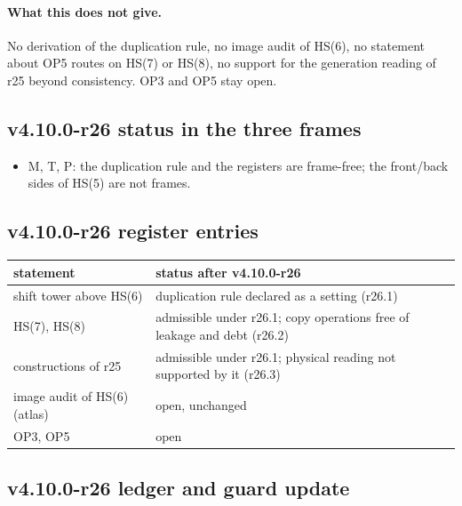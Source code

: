 \paragraph{What this does not give.}
No derivation of the duplication rule, no image audit of HS(6), no statement about OP5 routes on HS(7) or HS(8), no support for the
generation reading of r25 beyond consistency.  OP3 and OP5 stay open.

\subsection*{v4.10.0-r26 status in the three frames}
\label{subsec:v4100-r26-frames}

\begin{itemize}[leftmargin=2em]
\item M, T, P: the duplication rule and the registers are frame-free; the front/back sides of HS(5) are not frames.
\end{itemize}

\subsection*{v4.10.0-r26 register entries}
\label{subsec:v4100-r26-register}

\begin{center}
\small
\begin{tabular}{@{}>{\raggedright\arraybackslash}p{}>{\raggedright\arraybackslash}p{}@{}}
\toprule
statement & status after v4.10.0-r26\\
\midrule
shift tower above HS(6) & duplication rule declared as a setting (r26.1)\\
HS(7), HS(8) & admissible under r26.1; copy operations free of leakage and debt (r26.2)\\
constructions of r25 & admissible under r26.1; physical reading not supported by it (r26.3)\\
image audit of HS(6) (atlas) & open, unchanged\\
OP3, OP5 & open\\
\bottomrule
\end{tabular}
\end{center}

\subsection*{v4.10.0-r26 ledger and guard update}
\label{subsec:v4100-r26-ledger-guard}

